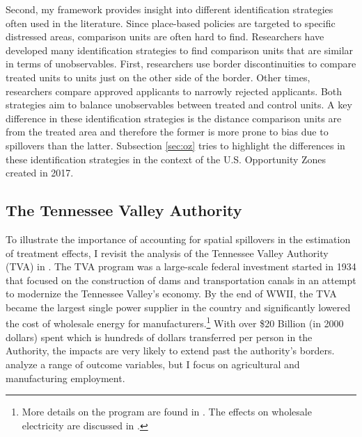 Second, my framework provides insight into different identification strategies often used in the literature. Since place-based policies are targeted to specific distressed areas, comparison units are often hard to find. Researchers have developed many identification strategies to find comparison units that are similar in terms of unobservables. First, researchers use border discontinuities to compare treated units to units just on the other side of the border. Other times, researchers compare approved applicants to narrowly rejected applicants. Both strategies aim to balance unobservables between treated and control units. A key difference in these identification strategies is the distance comparison units are from the treated area and therefore the former is more prone to bias due to spillovers than the latter. Subsection \ref{sec:oz} tries to highlight the differences in these identification strategies in the context of the U.S. Opportunity Zones created in 2017.

\subsection{The Tennessee Valley Authority}\label{sec:tva}

To illustrate the importance of accounting for spatial spillovers in the estimation of treatment effects, I revisit the analysis of the Tennessee Valley Authority (TVA) in \citet{Kline_Moretti_2014a}. The TVA program was a large-scale federal investment started in 1934 that focused on the construction of dams and transportation canals in an attempt to modernize the Tennessee Valley's economy. By the end of WWII, the TVA became the largest single power supplier in the country and significantly lowered the cost of wholesale energy for manufacturers.\footnote{More details on the program are found in \citet{Kline_Moretti_2014a}. The effects on wholesale electricity are discussed in \citet{Kitchens_2014}.} With over \$20 Billion (in 2000 dollars) spent which is hundreds of dollars transferred per person in the Authority, the impacts are very likely to extend past the authority's borders. \citet{Kline_Moretti_2014a} analyze a range of outcome variables, but I focus on agricultural and manufacturing employment. 

